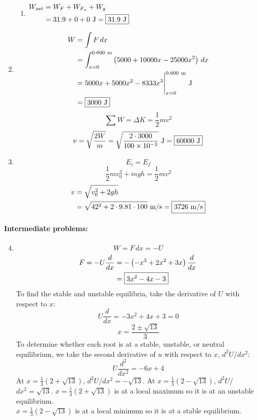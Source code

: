 \documentclass[12pt,letterpaper]{article}
\begin{document}
\begin{multicols}{2}
\begin{enumerate}
\begin{enumerate}[label=(\alph*)]
\item \(
\begin{aligned}
\displaystyle W_{\text{net}} &= W_F + W_{F_n} + W_g\\
               &= 31.9 + 0 + 0\ \text{J} = \fbox{31.9 J}
\end{aligned}
\)
\end{enumerate}

\item \[
\begin{aligned}
W &= \int F\,dx\\
  &= \int_{x = 0}^{0.600\ \text{m}} \left(5000+10000x-25000x^2\right)\,dx\\
  &= 5000x+5000x^2-8333x^3\Biggr|_{x = 0}^{0.600\ \text{m}}\ \text{J}\\
  &= \fbox{3000 J}
\end{aligned}
\]
$$\sum W = \Delta K = \frac{1}{2}mv^2$$
$$v =\sqrt{\frac{2W}{m}}=\sqrt{\frac{2\cdot 3000}{100 \times 10^{-3}}}\ \text{J} = \fbox{60000 J}$$

\item
$$E_i=E_f$$
$$\frac{1}{2}mv_0^2 + mgh = \frac{1}{2}mv^2$$
\[
\begin{aligned}
v &= \sqrt{v_0^2 + 2gh}\\
  &= \sqrt{42^2 + 2\cdot 9.81\cdot 100}\ \text{m\slash s} = \fbox{3726 m\slash s}
\end{aligned}
\]
\end{enumerate}
\paragraph{Intermediate problems:}
\begin{enumerate}
\setcounter{enumi}{3}
\item
$$W = F\,dx = -U$$
\[
\begin{aligned}
F = -U \frac{d}{dx} &= -\left(-x^3+2x^2+3x\right) \frac{d}{dx}\\
                    &= \fbox{$\displaystyle 3x^2-4x-3$}
\end{aligned}
\]
To find the stable and unstable equilibria, take the derivative of $U$ with respect to $x$:
$$U \frac{d}{dx} = -3x^2+4x+3 = 0$$
$$x = \frac{2 \pm \sqrt{13}}{3}$$
To determine whether each root is at a stable, unstable, or neutral equilibrium, we take the second derivative of $u$ with respect to $x$, $d^2U$\slash $dx^2$:
$$U \frac{d^2}{dx^2} = -6x+4$$
At $x = \frac{1}{3}\left(2 + \sqrt{13}\right)$, $d^2U$\slash $dx^2 = -\sqrt{13}$. At $x = \frac{1}{3}\left(2 - \sqrt{13}\right)$, $d^2U$\slash $dx^2 = \sqrt{13}$.
$x = \frac{1}{3}\left(2 + \sqrt{13}\right)$ is at a local maximum so it is at an unstable equilibrium.\\
$x = \frac{1}{3}\left(2 - \sqrt{13}\right)$ is at a local minimum so it is at a stable equilibrium. 


\end{enumerate}
\end{multicols}
\end{document}
